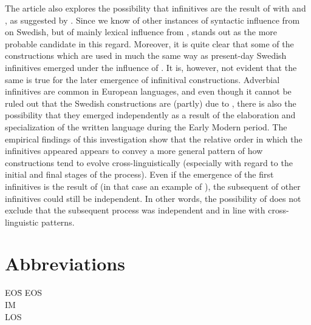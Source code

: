 \documentclass[output=paper]{langscibook}
\begin{document}
The article also explores the possibility that  infinitives are the result of  with  and , as suggested by \citet{Holm1967}. Since we know of other instances of syntactic influence from  on Swedish, but of mainly lexical influence from ,  stands out as the more probable candidate in this regard. Moreover, it is quite clear that some of the   constructions which are used in much the same way as present-day Swedish  infinitives emerged under the influence of . It is, however, not evident that the same is true for the later emergence of infinitival constructions. Adverbial infinitives are common in European languages, and even though it cannot be ruled out that the Swedish constructions are (partly) due to , there is also the possibility that they emerged independently as a result of the elaboration and specialization of the written language during the Early Modern period. The empirical findings of this investigation show that the relative order in which the  infinitives appeared appears to convey a more general pattern of how  constructions tend to evolve cross-linguistically (especially with regard to the initial and final stages of the process). Even if the emergence of the first  infinitives is the result of  (in that case an example of ), the subsequent  of other  infinitives could still be independent. In other words, the possibility of  does not exclude that the subsequent  process was independent and in line with cross-linguistic patterns. 


\section*{Abbreviations}
\begin{tabbing}
EOS\hspace{1ex}\= \kill
EOS \> \\
IM  \> \\
LOS \> \\
\end{tabbing}
\end{document}
